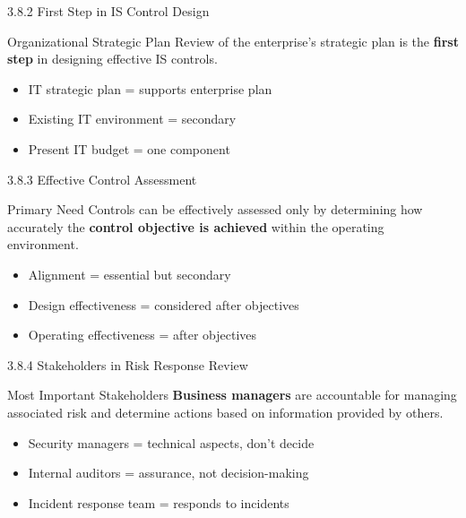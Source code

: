 \documentclass{beamer}
\begin{document}
	\begin{frame}{3.8.2 First Step in IS Control Design}
		\begin{block}{Organizational Strategic Plan}
			Review of the enterprise's strategic plan is the \textbf{first step} in designing effective IS controls.
		\end{block}
		\begin{itemize}
			\item IT strategic plan = supports enterprise plan
			\item Existing IT environment = secondary
			\item Present IT budget = one component
		\end{itemize}
	\end{frame}
	
	\begin{frame}{3.8.3 Effective Control Assessment}
		\begin{block}{Primary Need}
			Controls can be effectively assessed only by determining how accurately the \textbf{control objective is achieved} within the operating environment.
		\end{block}
		\begin{itemize}
			\item Alignment = essential but secondary
			\item Design effectiveness = considered after objectives
			\item Operating effectiveness = after objectives
		\end{itemize}
	\end{frame}
	
	\begin{frame}{3.8.4 Stakeholders in Risk Response Review}
		\begin{block}{Most Important Stakeholders}
			\textbf{Business managers} are accountable for managing associated risk and determine actions based on information provided by others.
		\end{block}
		\begin{itemize}
			\item Security managers = technical aspects, don't decide
			\item Internal auditors = assurance, not decision-making
			\item Incident response team = responds to incidents
		\end{itemize}
	\end{frame}
	
\end{document}
